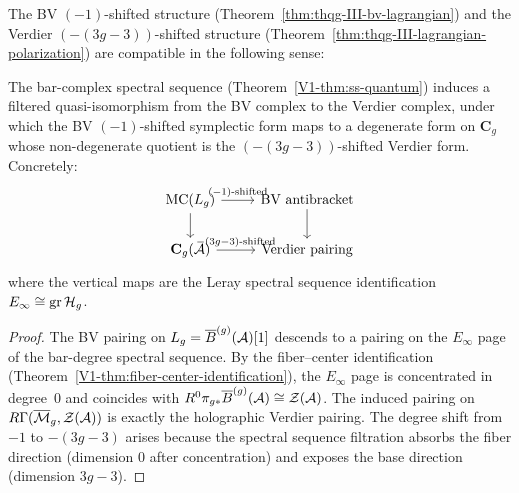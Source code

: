 \begin{proposition}
The BV $(-1)$-shifted structure
\textup{(}Theorem~\textup{\ref{thm:thqg-III-bv-lagrangian})}
and the Verdier $(-(3g-3))$-shifted structure
\textup{(}Theorem~\textup{\ref{thm:thqg-III-lagrangian-polarization})}
are compatible in the following sense:

The bar-complex spectral sequence
\textup{(}Theorem~\textup{\ref{V1-thm:ss-quantum})} induces a
filtered quasi-isomorphism from the BV complex to the Verdier
complex, under which the BV $(-1)$-shifted symplectic form
maps to a degenerate form on $\mathbf{C}_g$ whose
non-degenerate quotient is the $(-(3g-3))$-shifted Verdier
form. Concretely:
\begin{equation}%
\begin{tikzcd}
\MC(L_g) \arrow[r, "{(-1)\text{-shifted}}"] \arrow[d] &
\text{BV antibracket} \arrow[d] \\
\mathbf{C}_g(\cA)
\arrow[r, "{-(3g{-}3)\text{-shifted}}"]
& \text{Verdier pairing}
\end{tikzcd}
\end{equation}
where the vertical maps are the Leray spectral sequence
identification $E_\infty \cong \operatorname{gr} \mathcal{H}_g$.
\end{proposition}

\begin{proof}
The BV pairing on $L_g = \overline{B}^{(g)}(\mathcal{A})[1]$ descends to
a pairing on the $E_\infty$ page of the bar-degree spectral
sequence. By the fiber--center identification
(Theorem~\ref{V1-thm:fiber-center-identification}), the
$E_\infty$ page is concentrated in degree~$0$ and coincides
with $R^0\pi_{g*}\overline{B}^{(g)}(\mathcal{A}) \cong \mathcal{Z}(\mathcal{A})$.
The induced pairing on $R\Gamma(\overline{\mathcal{M}}_g,
\mathcal{Z}(\mathcal{A}))$ is exactly the holographic Verdier pairing.
The degree shift from $-1$ to $-(3g-3)$ arises because the
spectral sequence filtration absorbs the fiber direction
(dimension $0$ after concentration) and exposes the base
direction (dimension $3g - 3$).
\end{proof}

